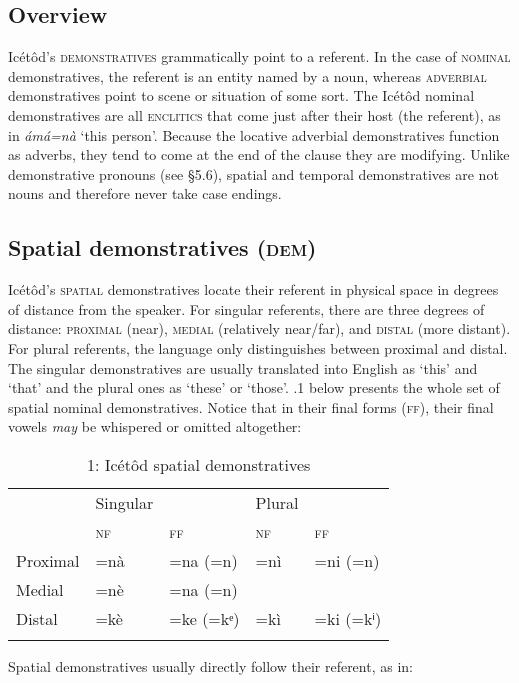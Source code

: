 \subsection{Overview}


Icétôd’s \textsc{demonstratives} grammatically point to a referent. In the case of \textsc{nominal} demonstratives, the referent is an entity named by a noun, whereas \textsc{adverbial} demonstratives point to scene or situation of some sort. The Icétôd nominal demonstratives are all \textsc{enclitics} that come just after their host (the referent), as in \textit{ámá=nà} ‘this person’. Because the locative adverbial demonstratives function as adverbs, they tend to come at the end of the clause they are modifying. Unlike demonstrative pronouns (see §5.6), spatial and temporal demonstratives are not nouns and therefore never take case endings.




\subsection{Spatial demonstratives (\textsc{dem})}


Icétôd’s \textsc{spatial} demonstratives locate their referent in physical space in degrees of distance from the speaker. For singular referents, there are three degrees of distance: \textsc{proximal} (near), \textsc{medial} (relatively near/far), and \textsc{distal} (more distant). For plural referents, the language only distinguishes between proximal and distal. The singular demonstratives are usually translated into English as ‘this’ and ‘that’ and the plural ones as ‘these’ or ‘those’. .1 below presents the whole set of spatial nominal demonstratives. Notice that in their final forms (\textsc{ff}), their final vowels \textit{may} be whispered or omitted altogether:


\begin{table}
\caption{1: Icétôd spatial demonstratives}
\label{tab:6}


\begin{tabularx}{\textwidth}{XXXXX} & Singular &  & Plural & \\
\lsptoprule
& \textsc{nf} & \textsc{ff} & \textsc{nf} & \textsc{ff}\\
Proximal & =nà & =na (=n) & =nì & =ni (=n)\\
Medial & =nè & =na (=n) &  & \\
Distal & =kè & =ke (=kᵉ) & =kì & =ki (=kⁱ)\\
\lspbottomrule
\end{tabularx}
\end{table}
Spatial demonstratives usually directly follow their referent, as in:




